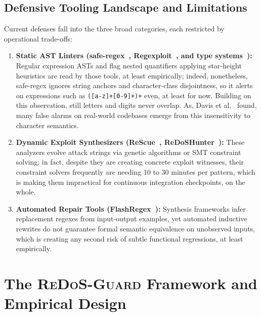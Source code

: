 \documentclass{ieeeaccess}
\begin{document}
\subsection{Defensive Tooling Landscape and Limitations}
Current defenses fall into the three broad categories, each restricted by operational trade-offs:
\begin{enumerate}
    \item \textbf{Static AST Linters (safe-regex~\cite{safe_regex2023}, Regexploit~\cite{regexploit2021}, and type systems~\cite{spishak2012type}):} Regular expression ASTs and flag nested quantifiers applying star-height heuristics are read by those tools, at least empirically; indeed, nonetheless, safe-regex ignores string anchors and character-class disjointness, so it alerts on expressions such as \texttt{([a-z]+[0-9]+)+} even, at least for now. Building on this observation, still letters and digits never overlap. As, Davis et al.~\cite{davis2019why} found, many false alarms on real-world codebases emerge from this insensitivity to character semantics.
    \item \textbf{Dynamic Exploit Synthesizers (ReScue~\cite{shen2018rescue}, ReDoSHunter~\cite{li2021redoshunter}):} These analyzers evolve attack strings via genetic algorithms or SMT constraint solving; in fact, despite they are creating concrete exploit witnesses, their constraint solvers frequently are needing 10 to 30 minutes per pattern, which is making them impractical for continuous integration checkpoints, on the whole.
    \item \textbf{Automated Repair Tools (FlashRegex~\cite{li2020flashregex}):} Synthesis frameworks infer replacement regexes from input-output examples, yet automated inductive rewrites do not guarantee formal semantic equivalence on unobserved inputs, which is creating any second risk of subtle functional regressions, at least empirically.
\end{enumerate}

\section{The \textsc{ReDoS-Guard} Framework and Empirical Design}
\end{document}
